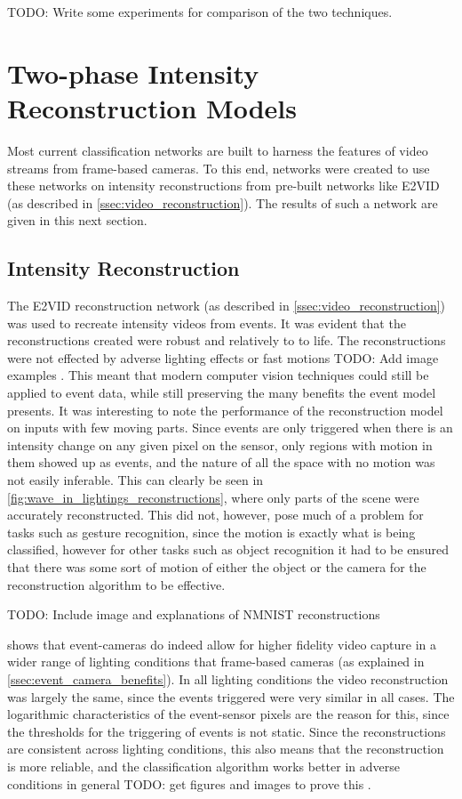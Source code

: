 \color{red} TODO: Write some experiments for comparison of the two techniques. \color{black} 

\section{Two-phase Intensity Reconstruction Models}

Most current classification networks are built to harness the features of video streams from frame-based cameras. To this end, networks were created to use these networks on intensity reconstructions from pre-built networks like E2VID (as described in \cref{ssec:video_reconstruction}). The results of such a network are given in this next section.

\subsection{Intensity Reconstruction}

The E2VID reconstruction network (as described in \cref{ssec:video_reconstruction}) was used to recreate intensity videos from events. It was evident that the reconstructions created were robust and relatively to to life. The reconstructions were not effected by adverse lighting effects or fast motions \color{red} TODO: Add image examples \color{black}. This meant that modern computer vision techniques could still be applied to event data, while still preserving the many benefits the event model presents. It was interesting to note the performance of the reconstruction model on inputs with few moving parts. Since events are only triggered when there is an intensity change on any given pixel on the sensor, only regions with motion in them showed up as events, and the nature of all the space with no motion was not easily inferable. This can clearly be seen in \cref{fig:wave_in_lightings_reconstructions}, where only parts of the scene were accurately reconstructed. This did not, however, pose much of a problem for tasks such as gesture recognition, since the motion is exactly what is being classified, however for other tasks such as object recognition it had to be ensured that there was some sort of motion of either the object or the camera for the reconstruction algorithm to be effective.

\color{red} TODO: Include image and explanations of NMNIST reconstructions \color{black}

 shows that event-cameras do indeed allow for higher fidelity video capture in a wider range of lighting conditions that frame-based cameras (as explained in \cref{ssec:event_camera_benefits}). In all lighting conditions the video reconstruction was largely the same, since the events triggered were very similar in all cases. The logarithmic characteristics of the event-sensor pixels are the reason for this, since the thresholds for the triggering of events is not static. Since the reconstructions are consistent across lighting conditions, this also means that the reconstruction is more reliable, and the classification algorithm works better in adverse conditions in general \color{red} TODO: get figures and images to prove this \color{black}.

